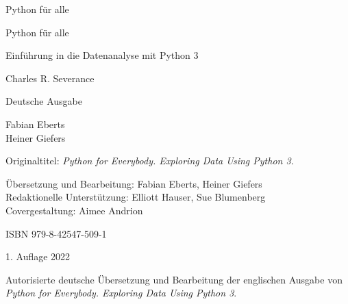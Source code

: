 \begin{titlepage}
\begin{center}
\vspace*{15mm}

\sffamily
\LARGE
Python für alle

\end{center}
\end{titlepage}

\cleardoublepage
\thispagestyle{plain}

\begin{center}
\vspace*{15mm}

\sffamily
\LARGE
Python für alle

\Large
Einführung in die Datenanalyse mit Python 3

\vspace{15mm}

\Large
Charles R. Severance

\vspace{10mm}

\normalsize
Deutsche Ausgabe

\vspace{2mm}

\large
Fabian Eberts\\
Heiner Giefers



\end{center}

\normalsize
\normalfont


\clearpage
\thispagestyle{plain}

Originaltitel: \textit{Python for Everybody. Exploring Data Using Python 3.}
\bigskip

Übersetzung und Bearbeitung: Fabian Eberts, Heiner Giefers\\
Redaktionelle Unterstützung: Elliott Hauser, Sue Blumenberg\\
Covergestaltung: Aimee Andrion
\bigskip

ISBN 979-8-42547-509-1
\bigskip

1. Auflage 2022

Autorisierte deutsche Übersetzung und Bearbeitung der englischen Ausgabe von \textit{Python for Everybody. Exploring Data Using Python 3}.
\bigskip

